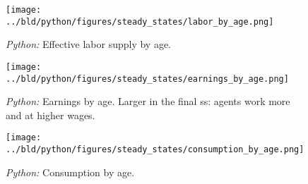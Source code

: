 \begin{figure}
    
    \centering
    \texttt{[image: ../bld/python/figures/steady\_states/labor\_by\_age.png]}
    \caption{\emph{Python:} Effective labor supply by age.}
    \label{fig:python-L}

\end{figure}

\begin{figure}

    \centering
    \texttt{[image: ../bld/python/figures/steady\_states/earnings\_by\_age.png]}
    \caption{\emph{Python:} Earnings by age. Larger in the final ss: agents work more and at higher wages.}
    \label{fig:python-E}

\end{figure}


\begin{figure}

    \centering
    \texttt{[image: ../bld/python/figures/steady\_states/consumption\_by\_age.png]}
    \caption{\emph{Python:} Consumption by age.}
    \label{fig:python-C}

\end{figure}

\printbibliography

